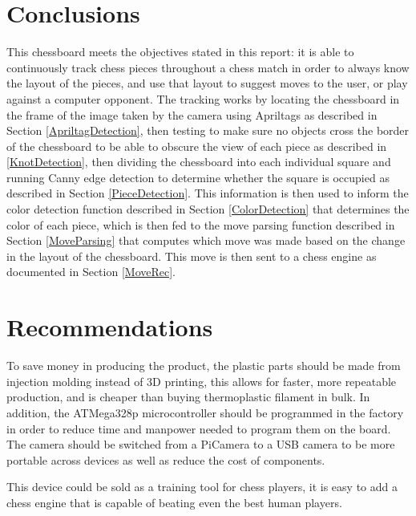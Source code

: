 \documentclass[journal]{IEEEtran}
\begin{document}
\section{Conclusions}
This chessboard meets the objectives stated in this report: it is able to continuously track chess pieces throughout a chess match in order to always know the layout of the pieces, and use that layout to suggest moves to the user, or play against a computer opponent.
The tracking works by locating the chessboard in the frame of the image taken by the camera using Apriltags as described in Section \ref{ApriltagDetection}, then testing to make sure no objects cross the border of the chessboard to be able to obscure the view of each piece as described in \ref{KnotDetection}, then dividing the chessboard into each individual square and running Canny edge detection to determine whether the square is occupied as described in Section \ref{PieceDetection}. This information is then used to inform the color detection function described in Section \ref{ColorDetection} that determines the color of each piece, which is then fed to the move parsing function described in Section \ref{MoveParsing} that computes which move was made based on the change in the layout of the chessboard. This move is then sent to a chess engine as documented in Section \ref{MoveRec}.

\section{Recommendations}
To save money in producing the product, the plastic parts should be made from injection molding instead of 3D printing, this allows for faster, more repeatable production, and is cheaper than buying thermoplastic filament in bulk. In addition, the ATMega328p microcontroller should be programmed in the factory in order to reduce time and manpower needed to program them on the board.
The camera should be switched from a PiCamera to a USB camera to be more portable across devices as well as reduce the cost of components.

This device could be sold as a training tool for chess players, it is easy to add a chess engine that is capable of beating even the best human players.
\end{document}
